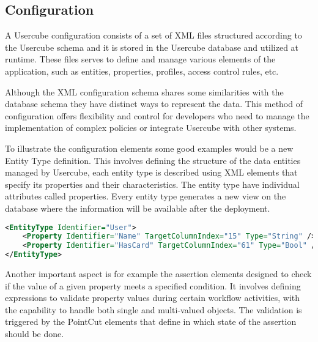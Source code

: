 \subsection{Configuration}

A Usercube configuration consists of a set of XML files structured according to the Usercube schema and it is stored in the Usercube database and utilized at runtime. These files serves to define and manage various elements of the application, such as entities, properties, profiles, access control rules, etc. 

Although the XML configuration schema shares some similarities with the database schema they have distinct ways to represent the data. This method of configuration offers flexibility and control for developers who need to manage the implementation of complex policies or integrate Usercube with other systems.

To illustrate the configuration elements some good examples would be a new Entity Type definition. This involves defining the structure of the data entities managed by Usercube, each entity type is described using XML elements that specify its properties and their characteristics. The entity type have individual attributes called properties. Every entity type generates a new view on the database where the information will be available after the deployment.


\begin{lstlisting}[language=XML, caption=Definition of the User Entity Type example]
<EntityType Identifier="User">
    <Property Identifier="Name" TargetColumnIndex="15" Type="String" />
    <Property Identifier="HasCard" TargetColumnIndex="61" Type="Bool" />
</EntityType>
\end{lstlisting}

Another important aspect is for example the assertion elements designed to check if the value of a given property meets a specified condition. It involves defining expressions to validate property values during certain workflow activities, with the capability to handle both single and multi-valued objects. The validation is triggered by the PointCut elements that define in which state of the assertion should be done.

